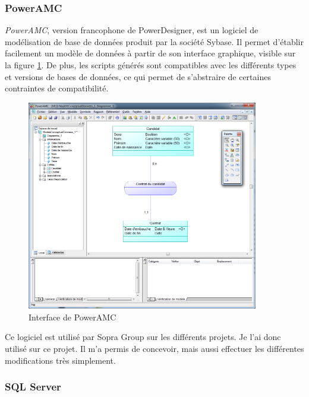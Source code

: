 
\subsubsection{PowerAMC}

\textit{PowerAMC}, version francophone de PowerDesigner, est un logiciel de modélisation de base de données produit par la société Sybase.
Il permet d'établir facilement un modèle de données à partir de son interface graphique, visible sur la figure \ref{PowerAMC}.
De plus, les scripts générés sont compatibles avec les différents types et versions de bases de données, ce qui permet de s'abstraire de certaines contraintes de compatibilité.
\begin{figure}[!h]
	\center
	\includegraphics[width=0.9\textwidth]{img/PowerAMC.png}
	\caption{Interface de PowerAMC}
	\label{PowerAMC}
\end{figure}

Ce logiciel est utilisé par Sopra Group sur les différents projets.
Je l'ai donc utilisé sur ce projet.
Il m'a permis de concevoir, mais aussi effectuer les différentes modifications très simplement.


\subsubsection{SQL Server}

